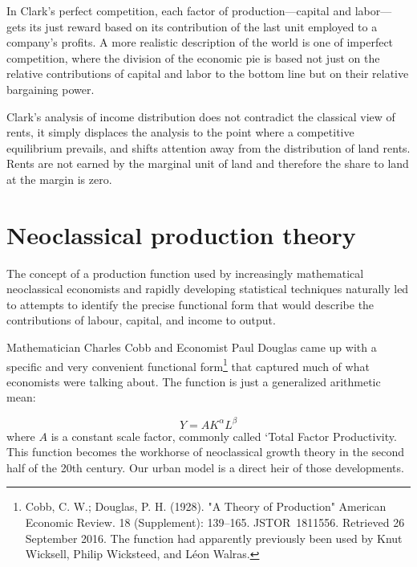  In Clark's  perfect competition, each factor of production—capital and labor—gets its just reward based on its contribution of  the last unit employed to a company’s profits. A more realistic description of the world is one of imperfect competition, where the division of the economic pie is based not just on the relative contributions of capital and labor to the bottom line but on their relative bargaining power. 
 
Clark's analysis of income distribution does not contradict the classical view of rents, it simply displaces the analysis to the point where a competitive equilibrium prevails, and shifts attention away from the distribution of land rents. Rents are not earned by the marginal unit of land and therefore the share to land at the margin is zero. 



\section{Neoclassical production theory}
The concept of a production function used by increasingly mathematical neoclassical economists and  rapidly developing statistical techniques  naturally led to attempts to identify the precise functional form that would describe the contributions of labour, capital, and income to output.
 
Mathematician Charles Cobb and Economist Paul Douglas came up with a specific and very convenient functional form\footnote{Cobb, C. W.; Douglas, P. H. (1928). "A Theory of Production"  American Economic Review. 18 (Supplement): 139–165. JSTOR 1811556. Retrieved 26 September 2016. The function had apparently previously been used by Knut Wicksell, Philip Wicksteed, and L\'eon Walras.} that captured much of what economists were talking about. The function is just a generalized arithmetic mean:
 
 \[Y=AK^\alpha L^\beta\]
 where $A$ is a constant scale factor, commonly called `Total Factor Productivity. This function becomes the workhorse of neoclassical growth theory in the second half  of the 20th century. Our urban model is a direct heir of those developments.



